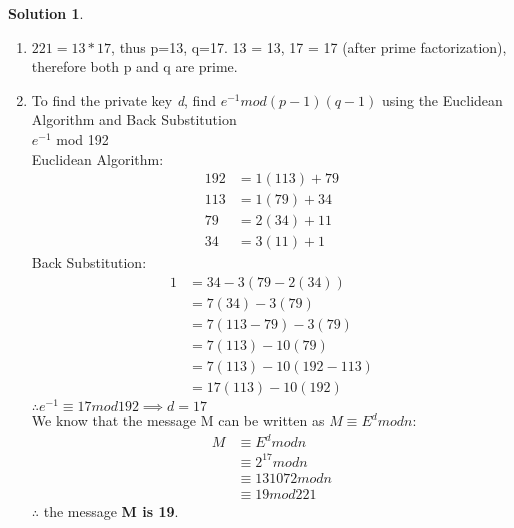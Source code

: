 \documentclass{article}
\theoremstyle{definition}
\newtheorem*{solution}{Solution}
\begin{document}
\begin{solution}
\begin{enumerate}[label=\alph*)]
    \item $221=13*17$, thus p=13, q=17. 13 = 13, 17 = 17 (after prime factorization), therefore both p and q are prime.
    
    \item To find the private key \textit{d}, find $e^{-1} mod (p-1)(q-1)$ using the Euclidean Algorithm and Back Substitution\\
    $e^{-1}$ mod 192\\
    Euclidean Algorithm:
    \begin{align*}
        192&=1(113)+79\\
        113&=1(79)+34\\
        79&=2(34)+11\\
        34&=3(11)+1
    \end{align*}
    Back Substitution:
    \begin{align*}
        1&=34-3(79-2(34))\\
        &=7(34)-3(79)\\
        &=7(113-79)-3(79)\\
        &=7(113)-10(79)\\
        &=7(113)-10(192-113)\\
        &=17(113)-10(192)
    \end{align*}
    $\therefore e^{-1}\equiv 17 mod 192\implies d=17$\\
    We know that the message M can be written as $M\equiv E^d mod n$:
    \begin{align*}
        M&\equiv E^d mod n\\
        &\equiv 2^{17} mod n\\
        &\equiv 131072 mod n\\
        &\equiv 19 mod 221
    \end{align*}
    $\therefore$ the message \textbf{M is 19}.
    

\end{enumerate}
\end{solution}
\end{document}
